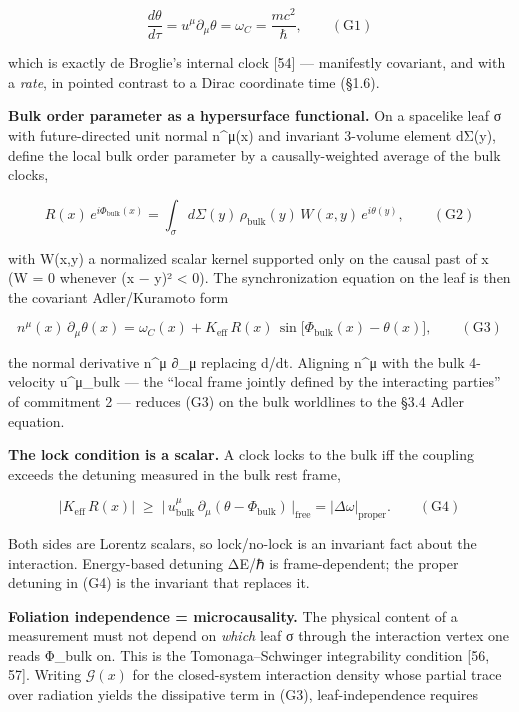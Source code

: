 \documentclass[
]{article}
\begin{document}
\[\frac{d\theta}{d\tau} = u^\mu \partial_\mu \theta = \omega_C = \frac{mc^2}{\hbar}, \qquad (\mathrm{G1})\]

which is exactly de Broglie's internal clock {[}54{]} --- manifestly
covariant, and with a \emph{rate}, in pointed contrast to a Dirac
coordinate time (§1.6).

\textbf{Bulk order parameter as a hypersurface functional.} On a
spacelike leaf σ with future-directed unit normal n\^{}μ(x) and
invariant 3-volume element dΣ(y), define the local bulk order parameter
by a causally-weighted average of the bulk clocks,

\[R(x)\,e^{i\Phi_{\text{bulk}}(x)} = \int_\sigma d\Sigma(y)\,\rho_{\text{bulk}}(y)\,W(x,y)\,e^{i\theta(y)}, \qquad (\mathrm{G2})\]

with W(x,y) a normalized scalar kernel supported only on the causal past
of x (W = 0 whenever (x − y)² \textless{} 0). The synchronization
equation on the leaf is then the covariant Adler/Kuramoto form

\[n^\mu(x)\,\partial_\mu \theta(x) = \omega_C(x) + K_{\text{eff}}\,R(x)\,\sin\!\big[\Phi_{\text{bulk}}(x) - \theta(x)\big], \qquad (\mathrm{G3})\]

the normal derivative n\^{}μ ∂\_μ replacing d/dt. Aligning n\^{}μ with
the bulk 4-velocity u\^{}μ\_bulk --- the ``local frame jointly defined
by the interacting parties'' of commitment 2 --- reduces (G3) on the
bulk worldlines to the §3.4 Adler equation.

\textbf{The lock condition is a scalar.} A clock locks to the bulk iff
the coupling exceeds the detuning measured in the bulk rest frame,

\[\big|K_{\text{eff}}\,R(x)\big| \;\ge\; \big|\,u^\mu_{\text{bulk}}\,\partial_\mu(\theta - \Phi_{\text{bulk}})\,\big|_{\text{free}} = |\Delta\omega|_{\text{proper}}. \qquad (\mathrm{G4})\]

Both sides are Lorentz scalars, so lock/no-lock is an invariant fact
about the interaction. Energy-based detuning ΔE/ℏ is frame-dependent;
the proper detuning in (G4) is the invariant that replaces it.

\textbf{Foliation independence = microcausality.} The physical content
of a measurement must not depend on \emph{which} leaf σ through the
interaction vertex one reads Φ\_bulk on. This is the Tomonaga--Schwinger
integrability condition {[}56, 57{]}. Writing \(\mathcal{G}(x)\) for the
closed-system interaction density whose partial trace over radiation
yields the dissipative term in (G3), leaf-independence requires
\end{document}
